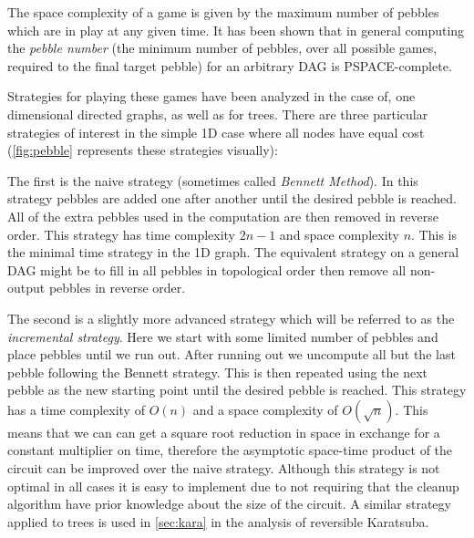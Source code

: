 The space complexity of a game is given by the maximum number of pebbles which
are in play at any given time. It has been shown that in general computing the
\emph{pebble number} (the minimum number of pebbles, over all possible games,
required to the final target pebble) for an arbitrary DAG is
PSPACE-complete\cite{chan13}\footnotemark.


Strategies for playing these games have been analyzed in the case of, one
dimensional directed graphs, as well as for trees\cite{peb16}.  There are three
particular strategies of interest in the simple 1D case where all nodes have
equal cost (\cref{fig:pebble} represents these strategies visually):

The first is the naive strategy (sometimes called \emph{Bennett Method}). In
this strategy pebbles are added one after another until the desired pebble is
reached.  All of the extra pebbles used in the computation are then removed in
reverse order. This strategy has time complexity $2n-1$ and space complexity
$n$. This is the minimal time strategy in the 1D graph. The equivalent strategy
on a general DAG might be to fill in all pebbles in topological order then
remove all non-output pebbles in reverse order.

The second is a slightly more advanced strategy which will be referred to as
the \emph{incremental strategy}. Here we start with some limited number of
pebbles and place pebbles until we run out. After running out we uncompute all
but the last pebble following the Bennett strategy. This is then repeated using
the next pebble as the new starting point until the desired pebble is reached.
This strategy has a time complexity of $O(n)$ and a space complexity of
$O(\sqrt n)$. This means that we can can get a square root reduction in space
in exchange for a constant multiplier on time, therefore the asymptotic
space-time product of the circuit can be improved over the naive strategy.
Although this strategy is not optimal in all cases it is easy to implement due
to not requiring that the cleanup algorithm have prior knowledge about the size
of the circuit. A similar strategy applied to trees is used in \cref{sec:kara}
in the analysis of reversible Karatsuba.

